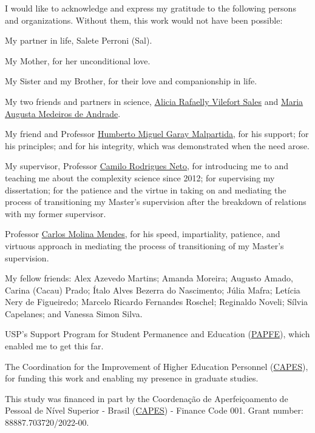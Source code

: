 \documentclass[
12pt,
openright,
oneside,
a4paper,
chapter=TITLE,
section=TITLE,
french,
spanish,
brazil,
english
]{abntex2}\usepackage{array}
\renewcommand{\baselinestretch}{1.5}
\renewcommand{\agradecimentosname}{Acknowledgements}
\renewcommand{\agradecimentosname}{Agradecimentos}
\renewcommand{\agradecimentosname}{Agradecimientos}
\begin{document}
\begin{agradecimentos}[\agradecimentosname]

I would like to acknowledge and express my gratitude to the following
persons and organizations. Without them, this work would not have been
possible:

\smallskip

My partner in life, Salete Perroni (Sal).

My Mother, for her unconditional love.

My Sister and my Brother, for their love and companionship in life.

My two friends and partners in science,
\href{https://orcid.org/0000-0003-0004-4487}{Alicia Rafaelly Vilefort
Sales} and \href{https://orcid.org/0000-0002-9283-9967}{Maria Augusta
Medeiros de Andrade}.

My friend and Professor
\href{https://orcid.org/0000-0002-1164-2055}{Humberto Miguel Garay
Malpartida}, for his support; for his principles; and for his integrity,
which was demonstrated when the need arose.

My supervisor, Professor
\href{https://orcid.org/0000-0001-6783-6695}{Camilo Rodrigues Neto}, for
introducing me to and teaching me about the complexity science since
2012; for supervising my dissertation; for the patience and the virtue
in taking on and mediating the process of transitioning my Master's
supervision after the breakdown of relations with my former supervisor.

Professor \href{https://orcid.org/0000-0003-2916-4415}{Carlos Molina
Mendes}, for his speed, impartiality, patience, and virtuous approach in
mediating the process of transitioning of my Master's supervision.

My fellow friends: Alex Azevedo Martins; Amanda Moreira; Augusto Amado,
Carina (Cacau) Prado; Ítalo Alves Bezerra do Nascimento; Júlia Mafra;
Letícia Nery de Figueiredo; Marcelo Ricardo Fernandes Roschel; Reginaldo
Noveli; Sílvia Capelanes; and Vanessa Simon Silva.

USP's Support Program for Student Permanence and Education
(\href{https://prip.usp.br/apoio-estudantil/}{PAPFE}), which enabled me
to get this far.

The Coordination for the Improvement of Higher Education Personnel
(\href{https://www.gov.br/capes/}{CAPES}), for funding this work and
enabling my presence in graduate studies.

\smallskip
\begingroup
\renewcommand{\baselinestretch}{1}

\noindent This study was financed in part by the Coordenação de
Aperfeiçoamento de Pessoal de Nível Superior - Brasil
(\href{https://www.gov.br/capes/}{CAPES}) - Finance Code 001. Grant
number: 88887.703720/2022-00.

\endgroup

\end{agradecimentos}
\end{document}
